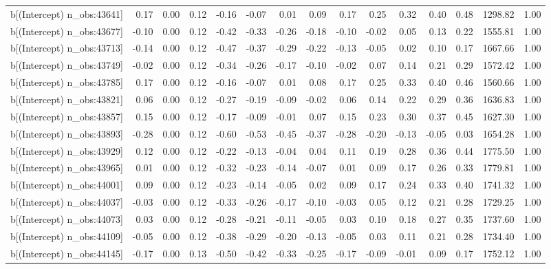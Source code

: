 \begin{table}[ht]
\begin{tabular}{rrrrrrrrrrrrrrr}
  b[(Intercept) n\_obs:43641] & 0.17 & 0.00 & 0.12 & -0.16 & -0.07 & 0.01 & 0.09 & 0.17 & 0.25 & 0.32 & 0.40 & 0.48 & 1298.82 & 1.00 \\ 
  b[(Intercept) n\_obs:43677] & -0.10 & 0.00 & 0.12 & -0.42 & -0.33 & -0.26 & -0.18 & -0.10 & -0.02 & 0.05 & 0.13 & 0.22 & 1555.81 & 1.00 \\ 
  b[(Intercept) n\_obs:43713] & -0.14 & 0.00 & 0.12 & -0.47 & -0.37 & -0.29 & -0.22 & -0.13 & -0.05 & 0.02 & 0.10 & 0.17 & 1667.66 & 1.00 \\ 
  b[(Intercept) n\_obs:43749] & -0.02 & 0.00 & 0.12 & -0.34 & -0.26 & -0.17 & -0.10 & -0.02 & 0.07 & 0.14 & 0.21 & 0.29 & 1572.42 & 1.00 \\ 
  b[(Intercept) n\_obs:43785] & 0.17 & 0.00 & 0.12 & -0.16 & -0.07 & 0.01 & 0.08 & 0.17 & 0.25 & 0.33 & 0.40 & 0.46 & 1560.66 & 1.00 \\ 
  b[(Intercept) n\_obs:43821] & 0.06 & 0.00 & 0.12 & -0.27 & -0.19 & -0.09 & -0.02 & 0.06 & 0.14 & 0.22 & 0.29 & 0.36 & 1636.83 & 1.00 \\ 
  b[(Intercept) n\_obs:43857] & 0.15 & 0.00 & 0.12 & -0.17 & -0.09 & -0.01 & 0.07 & 0.15 & 0.23 & 0.30 & 0.37 & 0.45 & 1627.30 & 1.00 \\ 
  b[(Intercept) n\_obs:43893] & -0.28 & 0.00 & 0.12 & -0.60 & -0.53 & -0.45 & -0.37 & -0.28 & -0.20 & -0.13 & -0.05 & 0.03 & 1654.28 & 1.00 \\ 
  b[(Intercept) n\_obs:43929] & 0.12 & 0.00 & 0.12 & -0.22 & -0.13 & -0.04 & 0.04 & 0.11 & 0.19 & 0.28 & 0.36 & 0.44 & 1775.50 & 1.00 \\ 
  b[(Intercept) n\_obs:43965] & 0.01 & 0.00 & 0.12 & -0.32 & -0.23 & -0.14 & -0.07 & 0.01 & 0.09 & 0.17 & 0.26 & 0.33 & 1779.81 & 1.00 \\ 
  b[(Intercept) n\_obs:44001] & 0.09 & 0.00 & 0.12 & -0.23 & -0.14 & -0.05 & 0.02 & 0.09 & 0.17 & 0.24 & 0.33 & 0.40 & 1741.32 & 1.00 \\ 
  b[(Intercept) n\_obs:44037] & -0.03 & 0.00 & 0.12 & -0.33 & -0.26 & -0.17 & -0.10 & -0.03 & 0.05 & 0.12 & 0.21 & 0.28 & 1729.25 & 1.00 \\ 
  b[(Intercept) n\_obs:44073] & 0.03 & 0.00 & 0.12 & -0.28 & -0.21 & -0.11 & -0.05 & 0.03 & 0.10 & 0.18 & 0.27 & 0.35 & 1737.60 & 1.00 \\ 
  b[(Intercept) n\_obs:44109] & -0.05 & 0.00 & 0.12 & -0.38 & -0.29 & -0.20 & -0.13 & -0.05 & 0.03 & 0.11 & 0.21 & 0.28 & 1734.40 & 1.00 \\ 
  b[(Intercept) n\_obs:44145] & -0.17 & 0.00 & 0.13 & -0.50 & -0.42 & -0.33 & -0.25 & -0.17 & -0.09 & -0.01 & 0.09 & 0.17 & 1752.12 & 1.00 \\ 

\end{tabular}
\end{table}
